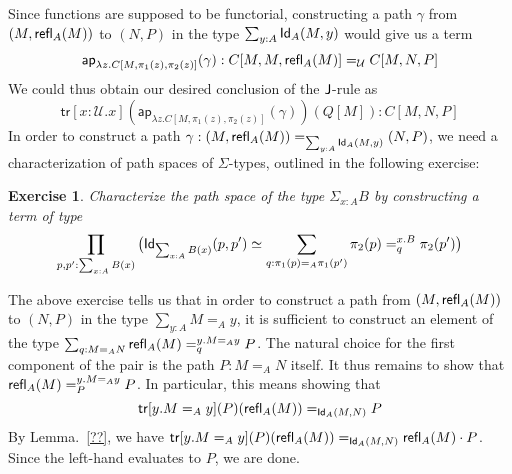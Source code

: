 \documentclass[12pt]{article}
\newcommand{\ap}{\mathsf{ap}}
\newcommand{\tr}{\mathsf{tr}}
\newtheorem*{exercise}{Exercise}
\begin{document}
Since functions are supposed to be functorial, constructing a path $\gamma$ from $(M,\mathsf{refl}_{A}(M))$ to $(N,P)$ in the type $\sum_{y:A} \mathsf{Id}_{A}(M,y)$ would give us a term
\[ \ap_{\lambda z. C[M, \pi_1(z), \pi_2(z)]}(\gamma) : C[M,M,\refl{A}(M)] =_\mathcal{U} C[M,N,P] \]
We could thus obtain our desired conclusion of the $\mathsf{J}$-rule as \[ \tr[x : \mathcal{U}.x](\ap_{\lambda z. C[M, \pi_1(z), \pi_2(z)]}(\gamma))(Q[M]) : C[M,N,P]\]
In order to construct a path {\small $\gamma : (M,\mathsf{refl}_{A}(M)) =_{\sum_{y:A} \mathsf{Id}_{A}(M,y)} (N,P)$}, we need a characterization of path spaces of $\Sigma$-types, outlined in the following exercise:

\begin{exercise} Characterize the path space of the type $\Sigma_{x:A} B$ by constructing a term of type
\small {\[ \prod_{p,p':\sum_{x:A}B(x)} \big( \mathsf{Id}_{\sum_{x:A}B(x)}(p,p')\simeq\sum_{q:\pi_1(p)=_A\pi_1(p')}\pi_2(p) =^{x.B}_q \pi_2(p') \big) \]}
\end{exercise}

The above exercise tells us that in order to construct a path from $(M,\mathsf{refl}_{A}(M))$ to $(N,P)$ in the type $\sum_{y:A}M=_A y$, it is sufficient to construct an element of the type
$\sum_{q:M=_A N}\mathsf{refl}_{A}(M) =^{y.M=_A y}_q P$. The natural choice for the first component of the pair is the path $P : M=_A N$ itself. It thus remains to show that $\mathsf{refl}_{A}(M) =^{y.M=_A y}_P P$. In particular, this means showing that \[ \tr[y.M=_A y](P)(\refl{A}(M)) =_{\Id{A}(M,N)} P \]
By Lemma.~\ref{??}, we have $\tr[y.M=_A y](P)(\refl{A}(M)) =_{\Id{A}(M,N)} \refl{A}(M) \cdot P$. Since the left-hand evaluates to $P$, we are done.
\end{document}
